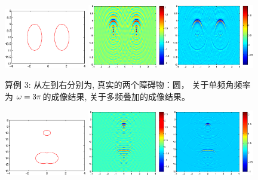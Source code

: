 {\begin{figure}[htbp]
	\centering
	\includegraphics[width=0.32\textwidth,height=0.16\textheight]{./Img/graphic/bi_circle_profile.eps}
	\includegraphics[width=0.32\textwidth]{./Img/graphic/bi_circle_3pi.eps}
	\includegraphics[width=0.32\textwidth]{./Img/graphic/bi_circle.eps}
	
	\caption{算例 3: 从左到右分别为,  真实的两个障碍物：圆， 关于单频角频率为 $\omega=3\pi$的成像结果, 关于多频叠加的成像结果。}\label{figure_31}
\end{figure}

\begin{figure}[htbp]
	\centering
	\includegraphics[width=0.32\textwidth,height=0.16\textheight]{./Img/graphic/circle_0_4_peanut_1_profile.eps}
	\includegraphics[width=0.32\textwidth]{./Img/graphic/circle_0_4_peanut_1_3pi_1.eps}
	\includegraphics[width=0.32\textwidth]{./Img/graphic/circle_0_4_peanut_1_multi_1.eps}
	

\end{figure}}
